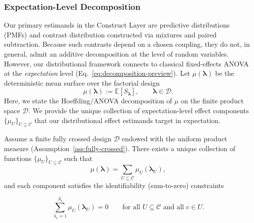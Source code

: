 \subsubsection{Expectation-Level Decomposition}
\label{app:expectation-decomposition}

Our primary estimands in the Construct Layer are predictive
distributions (PMFs) and contrast distribution constructed via
mixtures and paired subtraction. 
Because such contrasts depend on a chosen coupling, they do not, in general, admit an additive decomposition at the level of random variables.
However, our distributional framework connects to classical fixed-effects ANOVA at the \emph{expectation} level (Eq.~\ref{eq:decomposition-preview}). 
Let $\mu(\boldsymbol{\lambda})$ be the deterministic mean surface over the factorial design
\begin{equation}
\label{eq:mu-def}
\mu(\boldsymbol{\lambda})
:=
\mathbb{E}\!\left[S_{\boldsymbol{\lambda}}\right],
\qquad
\boldsymbol{\lambda}\in\mathcal{D}.
\end{equation}
Here, we state the Hoeffding/ANOVA decomposition of $\mu$ on the finite
product space $\mathcal{D}$. 
We provide the unique collection of expectation-level
effect components $\{\mu_U\}_{U\subseteq\mathcal{C}}$ that our distributional
effect estimands target in expectation.



\begin{theorem}
\label{thm:anova-expectation}
Assume a finite fully crossed design $\mathcal{D}$ endowed with the uniform
product measure (Assumption~\ref{ass:fully-crossed}). 
There exists a unique collection of functions
$\{\mu_U\}_{U\subseteq\mathcal{C}}$ such that
\begin{equation}
\label{eq:anova-decomp}
\mu(\boldsymbol{\lambda})
=
\sum_{U\subseteq\mathcal{C}}
\mu_U(\boldsymbol{\lambda}_U),
\end{equation}
and each component satisfies the identifiability (sum-to-zero) constraints

{\small
\begin{equation}
\label{eq:anova-identifiability}
\sum_{\lambda_c=1}^{\Lambda_c}
\mu_U(\boldsymbol{\lambda}_U)
=
0
\qquad
\text{for all }U\subseteq\mathcal{C}\text{ and all }c\in U.
\end{equation}
}
\end{theorem}

